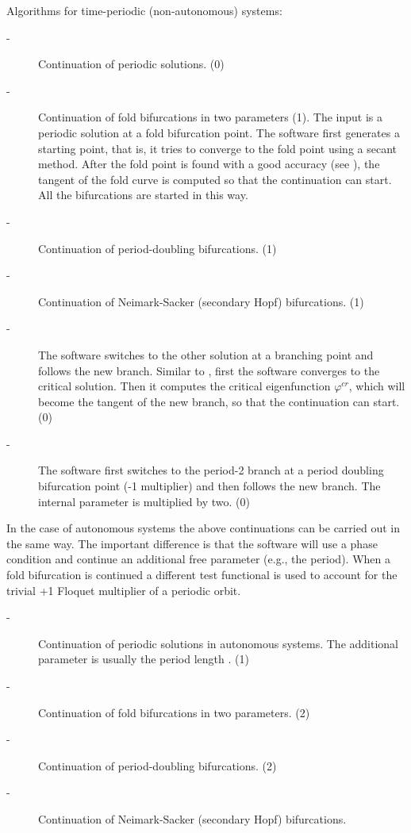 \documentclass[10pt,a4paper]{ddedoc}
\begin{document}
\begin{description}
Algorithms for time-periodic (non-autonomous) systems:
\begin{description}
\item[ -] Continuation of periodic solutions. (0)
%
\item[ -] Continuation of fold bifurcations in two parameters (1). The
input is a periodic solution at a fold bifurcation point. The software first
generates a starting point, that is, it tries to converge to the fold point
using a secant method. After the fold point is found with a good accuracy (see
), the tangent of the fold curve is computed so that the continuation
can start. All the bifurcations are started in this way.
%
\item[ -] Continuation of period-doubling bifurcations. (1)
%
\item[ -] Continuation of Neimark-Sacker (secondary Hopf) bifurcations.
(1)
%
\item[ -] The software switches to the other solution at a branching point and
follows the new branch. Similar to , first the software converges to
the critical solution. Then it computes the critical eigenfunction
$\varphi^{cr}$, which will become the tangent of the new branch, so that the
continuation can start. (0)
%
\item[ -] The software first switches to the period-2 branch at a
period doubling bifurcation point
(-1 multiplier) and then follows the new branch. The internal parameter  is multiplied by two. (0)
\end{description}
In the case of autonomous systems the above continuations can be carried out in
the same way. The important difference is that the software will use a phase
condition and continue an additional free parameter (e.g., the period). When a
fold bifurcation is continued a different test functional is used to account for
the trivial +1 Floquet multiplier of a periodic orbit.
\begin{description}
\item[ -] Continuation of periodic solutions in autonomous systems. The
additional parameter is usually the period length . (1)
%
\item[ -] Continuation of fold bifurcations in two parameters. (2)
%
\item[ -] Continuation of period-doubling bifurcations. (2)
%
\item[ -] Continuation of Neimark-Sacker (secondary Hopf) bifurcations.

\end{description}
\end{description}
\end{document}
